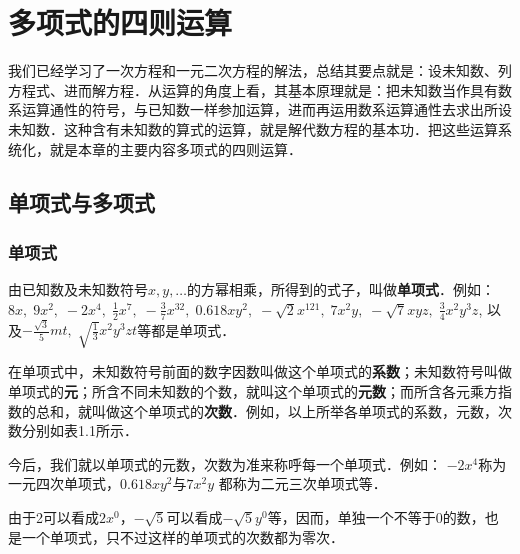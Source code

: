 \chapter{多项式的四则运算}

我们已经学习了一次方程和一元二次方程的解法，总结其要点就是：设未知数、列方程式、进而解方程．从运算的角度上看，其基本原理就是：把未知数当作具有数系运算通性的符号，与已知数一样参加运算，进而再运用数系运算通性去求出所设未知数．这种含有未知数的算式的运算，就是解代数方程的基本功．把这些运算系统化，就是本章的主要内容多项式的四则运算．

\section{单项式与多项式}
\subsection{单项式}
由已知数及未知数符号$x,y,\ldots$的方幂相乘，所得到的式子，叫做\textbf{单项式}．例如：
$8x,\; 9x^2,\; -2x^4,\; \frac{1}{2}x^7,\; -\frac{3}{7}x^{32},\; 0.618xy^2,\; -\sqrt{2}x^{121},\; 7x^2y,\; -\sqrt{7}xyz,\; \frac{3}{4}x^2y^3z$, 以及$-\frac{\sqrt{3}}{5}mt,\; \sqrt{\frac{1}{3}}x^2y^3zt$等都是单项式．

在单项式中，未知数符号前面的数字因数叫做这个单项式的\textbf{系数}；未知数符号叫做单项式的\textbf{元}；所含不同未知数的个数，就叫这个单项式的\textbf{元数}；而所含各元乘方指数的总和，就叫做这个单项式的\textbf{次数}．例如，以上所举各单项式的系数，元数，次数分别如表1.1所示．


今后，我们就以单项式的元数，次数为准来称呼每一个单项式．例如：
$-2x^4$称为一元四次单项式，$0.618xy^2$与$7x^2y$
都称为二元三次单项式等．

由于2可以看成$2x^0$，$-\sqrt{5}$可以看成$-\sqrt{5}y^0$等，因而，单独一个不等于0的数，也是一个单项式，只不过这样的单项式的次数都为零次．


